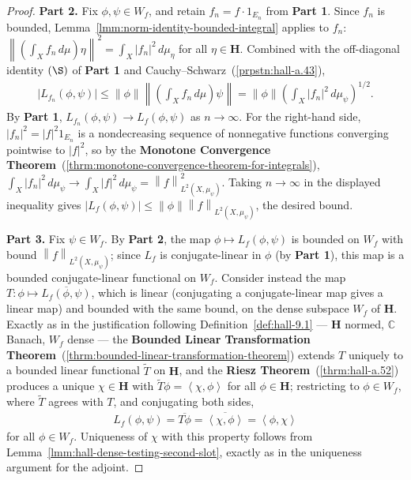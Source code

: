 \begin{proof}
\textbf{Part 2.} Fix $\phi, \psi \in W_f$, and retain $f_n = f \cdot 1_{E_n}$ from \textbf{Part 1}. Since $f_n$ is bounded, Lemma~\ref{lmm:norm-identity-bounded-integral} applies to $f_n$: $\left\| \left( \int_X f_n \, d\mu \right) \eta \right\|^2 = \int_X \lvert f_n \rvert^2 \, d\mu_\eta$ for all $\eta \in \mathbf{H}$. Combined with the off-diagonal identity $(\S)$ of \textbf{Part 1} and Cauchy–Schwarz~(\ref{prpstn:hall-a.43}),
\begin{align}
    \lvert L_{f_n}(\phi, \psi) \rvert \le \left\| \phi \right\| \left\| \left( \int_X f_n \, d\mu \right) \psi \right\| = \left\| \phi \right\| \left( \int_X \lvert f_n \rvert^2 \, d\mu_\psi \right)^{1/2}.
\end{align}
By \textbf{Part 1}, $L_{f_n}(\phi, \psi) \to L_f(\phi, \psi)$ as $n \to \infty$. For the right-hand side, $\lvert f_n \rvert^2 = \lvert f \rvert^2 1_{E_n}$ is a nondecreasing sequence of nonnegative functions converging pointwise to $\lvert f \rvert^2$, so by the \textbf{Monotone Convergence Theorem}~(\ref{thrm:monotone-convergence-theorem-for-integrals}), $\int_X \lvert f_n \rvert^2 \, d\mu_\psi \to \int_X \lvert f \rvert^2 \, d\mu_\psi = \left\| f \right\|_{L^2(X,\mu_\psi)}^2$. Taking $n \to \infty$ in the displayed inequality gives $\lvert L_f(\phi, \psi) \rvert \le \left\| \phi \right\| \left\| f \right\|_{L^2(X,\mu_\psi)}$, the desired bound.

\textbf{Part 3.} Fix $\psi \in W_f$. By \textbf{Part 2}, the map $\phi \mapsto L_f(\phi, \psi)$ is bounded on $W_f$ with bound $\left\| f \right\|_{L^2(X,\mu_\psi)}$; since $L_f$ is conjugate-linear in $\phi$ (by \textbf{Part 1}), this map is a bounded conjugate-linear functional on $W_f$. Consider instead the map $T : \phi \mapsto \overline{L_f(\phi, \psi)}$, which is linear (conjugating a conjugate-linear map gives a linear map) and bounded with the same bound, on the dense subspace $W_f$ of $\mathbf{H}$. Exactly as in the justification following Definition~\ref{def:hall-9.1} — $\mathbf{H}$ normed, $\mathbb{C}$ Banach, $W_f$ dense — the \textbf{Bounded Linear Transformation Theorem}~(\ref{thrm:bounded-linear-transformation-theorem}) extends $T$ uniquely to a bounded linear functional $\tilde{T}$ on $\mathbf{H}$, and the \textbf{Riesz Theorem}~(\ref{thrm:hall-a.52}) produces a unique $\chi \in \mathbf{H}$ with $\tilde{T}\phi = \left< \chi, \phi \right>$ for all $\phi \in \mathbf{H}$; restricting to $\phi \in W_f$, where $\tilde T$ agrees with $T$, and conjugating both sides,
\begin{align}
    L_f(\phi, \psi) = \overline{T\phi} = \overline{\left< \chi, \phi \right>} = \left< \phi, \chi \right>
\end{align}
for all $\phi \in W_f$. Uniqueness of $\chi$ with this property follows from Lemma~\ref{lmm:hall-dense-testing-second-slot}, exactly as in the uniqueness argument for the adjoint.


\end{proof}
